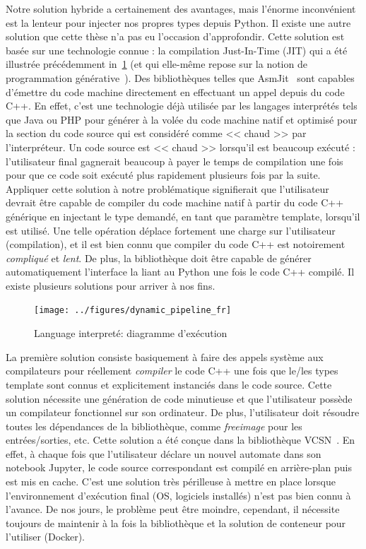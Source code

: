 Notre solution hybride a certainement des avantages, mais l'énorme inconvénient est la lenteur pour injecter nos propres
types depuis Python. Il existe une autre solution que cette thèse n'a pas eu l'occasion d'approfondir. Cette solution
est basée sur une technologie connue : la compilation Just-In-Time (JIT) qui a été illustrée précédemment
in~\cref{resume:fig:static.dynamic.dynamic.pipeline} (et qui elle-même repose sur la notion de programmation
générative~\parencite{czarnecki.2000.generative}). Des bibliothèques telles que AsmJit~\parencite{kobalicek.2011.asmjit}
sont capables d'émettre du code machine directement en effectuant un appel depuis du code C++. En effet, c'est une
technologie déjà utilisée par les langages interprétés tels que Java ou PHP pour générer à la volée du code machine
natif et optimisé pour la section du code source qui est considéré comme << chaud >> par l'interpréteur. Un code source
est << chaud >> lorsqu'il est beaucoup exécuté : l'utilisateur final gagnerait beaucoup à payer le temps de compilation
une fois pour que ce code soit exécuté plus rapidement plusieurs fois par la suite. Appliquer cette solution à notre
problématique signifierait que l'utilisateur devrait être capable de compiler du code machine natif à partir du code C++
générique en injectant le type demandé, en tant que paramètre template, lorsqu'il est utilisé. Une telle opération
déplace fortement une charge sur l'utilisateur (compilation), et il est bien connu que compiler du code C++ est
notoirement \emph{compliqué} et \emph{lent}. De plus, la bibliothèque doit être capable de générer automatiquement
l'interface la liant au Python une fois le code C++ compilé. Il existe plusieurs solutions pour arriver à nos fins.

\begin{figure}[htbp]
  \centering
  \texttt{[image: ../figures/dynamic\_pipeline\_fr]}
  \caption{Language interpreté: diagramme d'exécution}
  \label{resume:fig:static.dynamic.dynamic.pipeline}
\end{figure}

La première solution consiste basiquement à faire des appels système aux compilateurs pour réellement \emph{compiler} le
code C++ une fois que le/les types template sont connus et explicitement instanciés dans le code source. Cette solution
nécessite une génération de code minutieuse et que l'utilisateur possède un compilateur fonctionnel sur son ordinateur.
De plus, l'utilisateur doit résoudre toutes les dépendances de la bibliothèque, comme \emph{freeimage} pour les
entrées/sorties, etc. Cette solution a été conçue dans la bibliothèque VCSN~\parencite{demaille.2013.vcsn}. En effet, à
chaque fois que l'utilisateur déclare un nouvel automate dans son notebook Jupyter, le code source correspondant est
compilé en arrière-plan puis est mis en cache. C'est une solution très périlleuse à mettre en place lorsque
l'environnement d'exécution final (OS, logiciels installés) n'est pas bien connu à l'avance. De nos jours, le problème
peut être moindre, cependant, il nécessite toujours de maintenir à la fois la bibliothèque et la solution de conteneur
pour l'utiliser (Docker).

